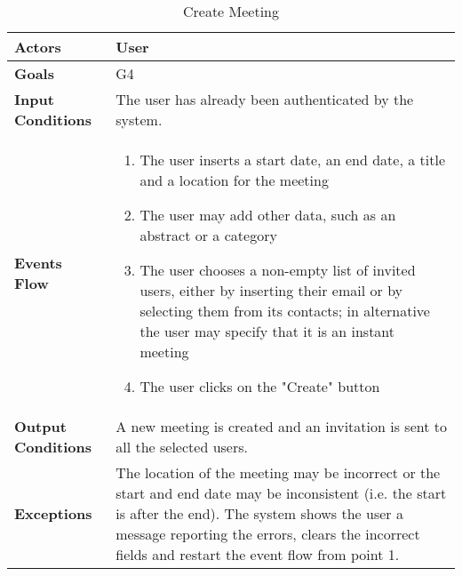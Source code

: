 \begin{table}[H]
	\centering
	\def\arraystretch{1.5}
	\begin{tabular}{|p{7cm}|p{7cm}|}
		\hline
		\textbf{Actors}            & User		    \\ \hline
		\textbf{Goals}             & G4           \\ \hline
		\textbf{Input Conditions}  & The user has already been authenticated by the system.           \\ \hline
		\textbf{Events Flow}       & 
			\begin{enumerate}[topsep=0pt, leftmargin=*]
				\item The user inserts a start date, an end date, a title and a location for the meeting
				\item The user may add other data, such as an abstract or a category
				\item The user chooses a non-empty list of invited users, either by inserting their email or by selecting them from its contacts; in alternative the user may specify that it is an instant meeting
				\item The user clicks on the "Create" button
			\end{enumerate}               \\ \hline
		\textbf{Output Conditions} & A new meeting is created and an invitation is sent to all the selected users.           \\ \hline
		\textbf{Exceptions}        & The location of the meeting may be incorrect or the start and end date may be inconsistent (i.e. the start is after the end). The system shows the user a message reporting the errors, clears the incorrect fields and restart the event flow from point 1.          \\ \hline
	\end{tabular}
	\caption{Create Meeting}
\end{table}


